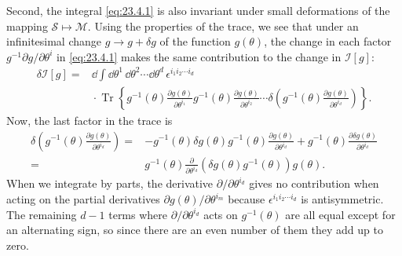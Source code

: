 Second, the integral \eqref{eq:23.4.1} is also invariant under small
deformations of the mapping $\mathcal S\mapsto\mathcal M$. Using the
properties of the trace, we see that under an infinitesimal change
$g\to g+\delta g$ of the function $g(\theta)$, the change in each factor
$g^{-1}\partial g/\partial\theta^{i}$ in \eqref{eq:23.4.1} makes the same
contribution to the change in $\mathcal I[g]$:
\begin{align*}
\delta\mathcal I[g]={}&\dd\int \dd\theta^1\,\dd\theta^2\cdots \dd\theta^d\,
\epsilon^{i_1i_2\cdots i_d}
\\
&{}\cdot\operatorname{Tr}\left\{
g^{-1}(\theta)\frac{\partial g(\theta)}{\partial\theta^{i_1}}
g^{-1}(\theta)\frac{\partial g(\theta)}{\partial\theta^{i_2}}
\cdots
\delta\left(
g^{-1}(\theta)\frac{\partial g(\theta)}{\partial\theta^{i_d}}
\right)\right\}.
\end{align*}
Now, the last factor in the trace is
\begin{align*}
\delta\left(
g^{-1}(\theta)\frac{\partial g(\theta)}{\partial\theta^{i_d}}
\right)
={}&-g^{-1}(\theta)\delta g(\theta)g^{-1}(\theta)
\frac{\partial g(\theta)}{\partial\theta^{i_d}}
+g^{-1}(\theta)\frac{\partial\delta g(\theta)}
{\partial\theta^{i_d}}
\\
={}&g^{-1}(\theta)\frac{\partial}{\partial\theta^{i_d}}
\left(\delta g(\theta)g^{-1}(\theta)\right)g(\theta).
\end{align*}
When we integrate by parts, the derivative
$\partial/\partial\theta^{i_d}$ gives no contribution when acting on the
partial derivatives $\partial g(\theta)/\partial\theta^{i_m}$ because
$\epsilon^{i_1i_2\cdots i_d}$ is antisymmetric. The remaining $d-1$
terms where $\partial/\partial\theta^{i_d}$ acts on $g^{-1}(\theta)$ are
all equal except for an alternating sign, so since there are an even
number of them they add up to zero.


